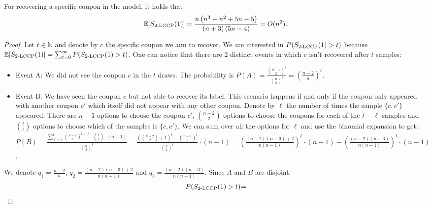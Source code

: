 \begin{theorem}
\label{theorem:expected_2ecd_specific_partialrecover_1}

For recovering a specific coupon in the  model, it holds that
$$\E[\ST{\kecd{2}{n}}{1}]  = \frac{n \left(n^3 + n^2 + 5n - 5\right)}{\left(n + 3\right)\left(5n - 4\right)}
= O(n^2).$$
\end{theorem}
\begin{proof}
    Let $t \in \mathbb{N}$ and denote by $c$ the specific coupon we aim to recover.
    We are interested in
    $P(\ST{\kecd{2}{n}}{1}>t)$
    because 
    $\E[\ST{\kecd{2}{n}}{1}] = \sum_{t=0}^{\infty}P(\ST{\kecd{2}{n}}{1}>t)$.
    One can notice that there are $2$ distinct events in which $c$ isn't recovered after $t$ samples:
    \begin{itemize}
        \item Event A: 
        We did not see the coupon $c$ in the $t$ draws.
        The probability is
        $P(A)=\frac{\binom{n-1}{2} ^t }{\binom{n}{2} ^t} = \left(\frac{n-2}{n}\right)^t$.
        \item Event B: 
        We have seen the coupon $c$ but not able to recover its label.
        This scenario happens if and only if the coupon only appeared with another coupon $c'$
        which itself did not appear with any other coupon.
        Denote by $\ell$ the number of times the sample $\{c,c'\}$ appeared.
        There are $n-1$ options to choose the coupon $c'$,
        $\binom{n-2}{2}$ options to choose the coupons for each of the $t-\ell$ samples 
        and $\binom{t}{\ell}$ options to choose which of the samples is $\{c,c'\}$.
        We can sum over all the options for $\ell$ and use the binomial expansion to get:
        $
        P(B) 
        =
        \frac{\sum_{\ell=1}^t {\binom{n-2}{2}^{t-\ell} \cdot \binom{t}{\ell} \cdot (n-1)}}{\binom{n}{2} ^t} 
        = 
        \frac{\left(\binom{n-2}{2} + 1 \right)^t - \binom{n-2}{2}^t}{\binom{n}{2} ^t} \cdot (n-1) 
        = 
        \left(\frac{(n-2)(n-3)+2}{n(n-1)}\right) ^t \cdot (n-1)
        -
        \left(\frac{(n-2)(n-3)}{n(n-1)}\right) ^t \cdot (n-1)
        $.
    \end{itemize}
    We denote $q_1 = \frac{n-2}{n}$,  $q_2 = \frac{(n-2)(n-3)+2}{n(n-1)}$ and $q_3 = \frac{(n-2)(n-3)}{n(n-1)}$.
    Since $A$ and $B$ are disjoint:
    \[\begin{array}{lcl}
    \hspace{-0.06cm}
    P(\ST{\kecd{2}{n}}{1}>t)  
    \hspace{-0.08cm}=\hspace{-0.08cm}

\end{array}\]
\end{proof}
